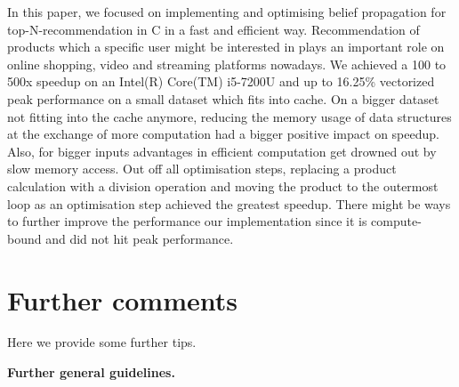 \documentclass[letterpaper]{article}
\newcommand{\mypar}[1]{{\bf #1.}}
\begin{document}
In this paper, we focused on implementing and optimising belief propagation for top-N-recommendation in C in a fast and efficient way.
Recommendation of products which a specific user might be interested in plays an important role on online shopping, video and streaming platforms nowadays. 
We achieved a 100 to 500x speedup on an Intel(R) Core(TM) i5-7200U and up to 16.25\% vectorized peak performance on a small dataset which fits into cache.
On a bigger dataset not fitting into the cache anymore, reducing the memory usage of data structures at the exchange of more computation had a bigger positive impact on speedup.
Also, for bigger inputs advantages in efficient computation get drowned out by slow memory access.
Out off all optimisation steps, replacing a product calculation with a division operation and moving the product to the outermost loop as an optimisation step achieved the greatest speedup.\sr{*}
There might be ways to further improve the performance our implementation since it is compute-bound and did not hit peak performance.\sr{*}


\section{Further comments}

Here we provide some further tips.

\mypar{Further general guidelines}
\end{document}
